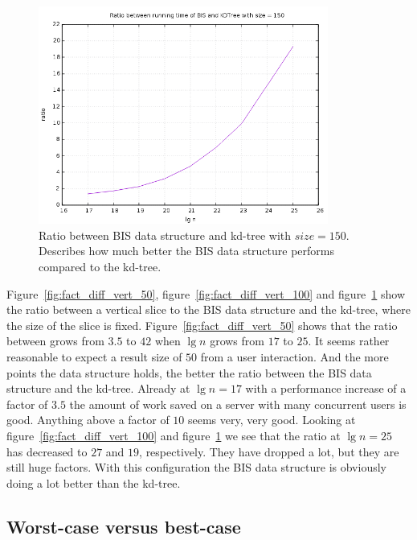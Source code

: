 \begin{figure}[h]
    \centering
    \includegraphics[width = 0.85\textwidth]{pictures/analysis/factor_difference_vert_150.png}
    \caption{Ratio between BIS data structure and kd-tree with $size=150$. Describes how much better the BIS data structure performs compared to the kd-tree.}\label{fig:fact_diff_vert_150}
\end{figure}
\clearpage


Figure~\ref{fig:fact_diff_vert_50}, figure~\ref{fig:fact_diff_vert_100} and figure~\ref{fig:fact_diff_vert_150} show the ratio between a vertical slice to the BIS data structure and the kd-tree, where the size of the slice is fixed. Figure~\ref{fig:fact_diff_vert_50} shows that the ratio between grows from $3.5$ to $42$ when $\lg n$ grows from $17$ to $25$. It seems rather reasonable to expect a result size of $50$ from a user interaction. And the more points the data structure holds, the better the ratio between the BIS data structure and the kd-tree. Already at $\lg n = 17$ with a performance increase of a factor of $3.5$ the amount of work saved on a server with many concurrent users is good. Anything above a factor of $10$ seems very, very good. Looking at figure~\ref{fig:fact_diff_vert_100} and figure~\ref{fig:fact_diff_vert_150} we see that the ratio at $\lg n = 25$ has decreased to $27$ and $19$, respectively. They have dropped a lot, but they are still huge factors. With this configuration the BIS data structure is obviously doing a lot better than the kd-tree.


\subsection{Worst-case versus best-case}


